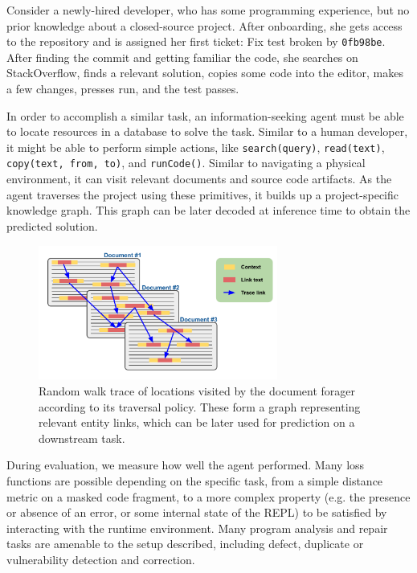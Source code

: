 \documentclass[11pt]{article}
\begin{document}
Consider a newly-hired developer, who has some programming experience, but no prior knowledge about a closed-source project. After onboarding, she gets access to the repository and is assigned her first ticket: Fix test broken by \texttt{0fb98be}. After finding the commit and getting familiar the code, she searches on StackOverflow, finds a relevant solution, copies some code into the editor, makes a few changes, presses run, and the test passes.

In order to accomplish a similar task, an information-seeking agent must be able to locate resources in a database to solve the task. Similar to a human developer, it might be able to perform simple actions, like \texttt{search(query)}, \texttt{read(text)}, \texttt{copy(text, from, to)}, and \texttt{runCode()}. Similar to navigating a physical environment, it can visit relevant documents and source code artifacts. As the agent traverses the project using these primitives, it builds up a project-specific knowledge graph. This graph can be later decoded at inference time to obtain the predicted solution.

\begin{figure}
  \centering
  \includegraphics[width=0.7\textwidth]{use_graph}
  \caption{Random walk trace of locations visited by the document forager according to its traversal policy. These form a graph representing relevant entity links, which can be later used for prediction on a downstream task.}
\end{figure}

During evaluation, we measure how well the agent performed. Many loss functions are possible depending on the specific task, from a simple distance metric on a masked code fragment, to a more complex property (e.g. the presence or absence of an error, or some internal state of the REPL) to be satisfied by interacting with the runtime environment. Many program analysis and repair tasks are amenable to the setup described, including defect, duplicate or vulnerability detection and correction.
\end{document}
